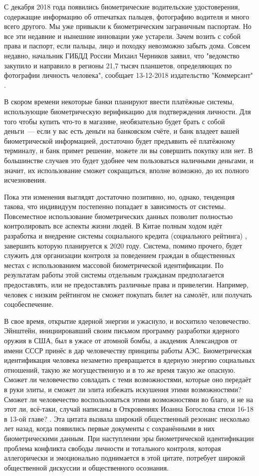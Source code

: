 \documentclass[14pt, a4paper]{extarticle}
\begin{document}
С декабря 2018 года появились биометрические водительские удостоверения, содержащие информацию об отпечатках пальцев, фотографию водителя и много всего другого. Мы уже привыкли к биометрическим заграничным паспортам. Но все эти недавние и нынешние инновации уже устарели. Зачем возить с собой права и паспорт, если пальцы, лицо и походку невозможно забыть дома. Совсем недавно, начальник ГИБДД России Михаил Черников заявил, что "ведомство закупило и направило в регионы 21,7 тысяч планшетов, определяющих по фотографии личность человека", сообщает 13-12-2018 издательство "Коммерсант" \cite{kommersant}.

В скором времени некоторые банки планируют ввести платёжные системы, использующие биометрическую верификацию для подтверждения личности. Для того чтобы купить что-то в магазине, необязательно будет брать с собой деньги~--- если у вас есть деньги на банковском счёте, и банк владеет вашей биометрической информацией, достаточно будет предъявить её платёжному терминалу, и банк примет решение, можете ли вы совершить покупку или нет. В большинстве случаев это будет удобнее чем пользоваться наличными деньгами, и значит, их использование сможет сокращаться, вполне возможно, до их полного исчезновения. 

Пока эти изменения выглядят достаточно позитивно, но, однако, тенденция такова, что индивидуум постепенно попадает в зависимость от системы. Повсеместное использование биометрических данных позволит полностью контролировать все аспекты жизни людей. В Китае полным ходом идёт разработка и внедрение системы социального кредита (социального рейтинга) \cite{social_score}, завершить которую планируется к 2020 году. Система, помимо прочего, будет служить для организации контроля за поведением граждан в общественных местах с использованием массовой биометрической идентификации. По результатам работы этой системы отдельным гражданам предполагается предоставлять, или не предоставлять различные права и привелегии. Например, человек с низким рейтингом не сможет покупать билет на самолёт, или получать соцобеспечение.

В свое время, открытие ядерной энергии и ужаснуло, и восхитило человечество. Эйнштейн, инициировавший своим письмом программу разработки ядерного оружия в США, был в ужасе от атомной бомбы, а академик Александров от имени СССР принёс в дар человечеству принципы работы АЭС. Биометрическая идентификация человека незаметно превращается в ядерную энергию социальных отношений, такую же могущественную и в то же время такую же опасную. Сможет ли человечество совладать с теми возможностями, которые оно передаёт в руки элиты, и сможет ли элита избежать искушения этими возможностями? Сможет ли человечество воспользоваться этими возможностями во благо, и не на этот ли, всё-таки, случай написаны в Откровениях Иоанна Богослова стихи 16-18 в 13-ой главе? \cite{bible}. Эта цитата вызвала широкий общественный резонанс несколько лет назад, когда появились первые документы с сохранёнными в них биометрическими данным. При наступлении эры биометрической идентификации проблема конфликта свободы личности и тотального контроля, которая аллегорически и эмоционально поднимается в этой цитате, потребует широкой общественной дискуссии и общественного осознания.
\end{document}
